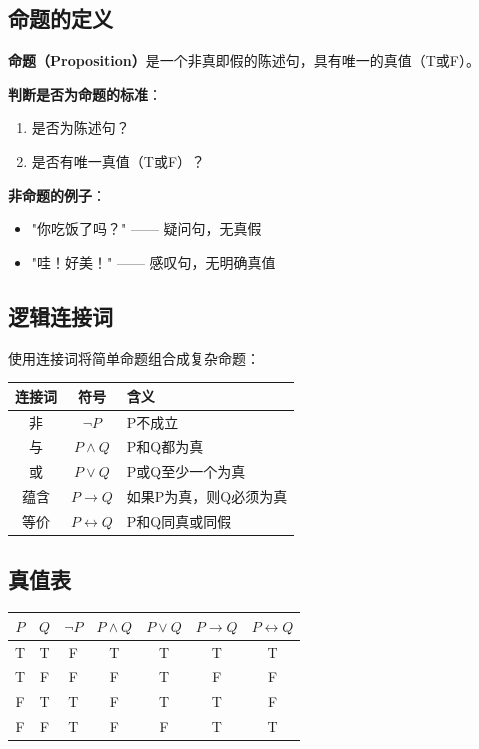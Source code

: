 \subsection{命题的定义}
\begin{conceptbox}
\textbf{命题（Proposition）}是一个非真即假的陈述句，具有唯一的真值（T或F）。
\end{conceptbox}

\textbf{判断是否为命题的标准}：
\begin{enumerate}[leftmargin=2em,itemsep=0pt]
    \item 是否为陈述句？
    \item 是否有唯一真值（T或F）？
\end{enumerate}

\textbf{非命题的例子}：
\begin{itemize}[leftmargin=2em,itemsep=0pt]
    \item "你吃饭了吗？" —— 疑问句，无真假
    \item "哇！好美！" —— 感叹句，无明确真值
\end{itemize}

\subsection{逻辑连接词}
使用连接词将简单命题组合成复杂命题：

\begin{table}[htbp]
\centering\small
\begin{tabular}{ccl}
\toprule
\textbf{连接词} & \textbf{符号} & \textbf{含义} \\
\midrule
非 & $\neg P$ & P不成立 \\
与 & $P \land Q$ & P和Q都为真 \\
或 & $P \lor Q$ & P或Q至少一个为真 \\
蕴含 & $P \to Q$ & 如果P为真，则Q必须为真 \\
等价 & $P \leftrightarrow Q$ & P和Q同真或同假 \\
\bottomrule
\end{tabular}
\end{table}

\subsection{真值表}
\begin{table}[htbp]
\centering\small
\begin{tabular}{cc|ccccc}
\toprule
$P$ & $Q$ & $\neg P$ & $P \land Q$ & $P \lor Q$ & $P \to Q$ & $P \leftrightarrow Q$ \\
\midrule
T & T & F & T & T & T & T \\
T & F & F & F & T & F & F \\
F & T & T & F & T & T & F \\
F & F & T & F & F & T & T \\
\bottomrule
\end{tabular}
\end{table}

